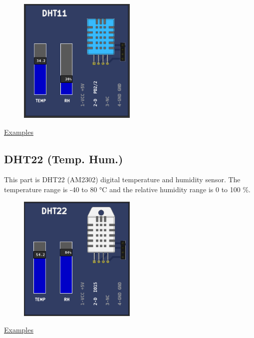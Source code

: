 \begin{figure}[H]
\center
\includegraphics[width=0.5\textwidth]{img/part_dht11.png} 
\end{figure} 


\href{https://lcgamboa.github.io/picsimlab_examples/parts_DHT11_(Temp._Hum.).html}{Examples}

\vspace{0.5cm}

\subsection{DHT22 (Temp. Hum.)} 

This part is DHT22 (AM2302) digital temperature and humidity sensor. The temperature  range is -40 to 80 °C  
and the relative humidity range is 0 to 100 \%.

\begin{figure}[H]
\center
\includegraphics[width=0.5\textwidth]{img/part_dht22.png} 
\end{figure} 


\href{https://lcgamboa.github.io/picsimlab_examples/parts_DHT22_(Temp._Hum.).html}{Examples}

